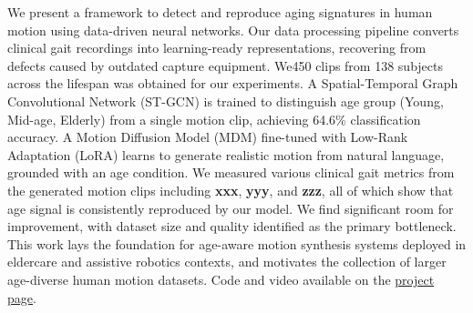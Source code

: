We present a framework to detect and reproduce aging signatures in human motion using data-driven neural networks.
Our data processing pipeline converts clinical gait recordings into learning-ready representations, recovering from defects caused by outdated capture equipment. We450 clips from 138 subjects across the lifespan was obtained for our experiments.
A Spatial-Temporal Graph Convolutional Network (ST-GCN) is trained to distinguish age group (Young, Mid-age, Elderly) from a single motion clip, achieving 64.6\% classification accuracy.
A Motion Diffusion Model (MDM) fine-tuned with Low-Rank Adaptation (LoRA) learns to generate realistic motion from natural language, grounded with an age condition.
We measured various clinical gait metrics from the generated motion clips including \textbf{xxx}, \textbf{yyy}, and \textbf{zzz}, all of which show that age signal is consistently reproduced by our model.
We find significant room for improvement, with dataset size and quality identified as the primary bottleneck.
This work lays the foundation for age-aware motion synthesis systems deployed in eldercare and assistive robotics contexts, and motivates the collection of larger age-diverse human motion datasets.
Code and video available on the \href{https://catr1xliu.github.io/Notebook/Aging-Motion-Project/}{project page}.